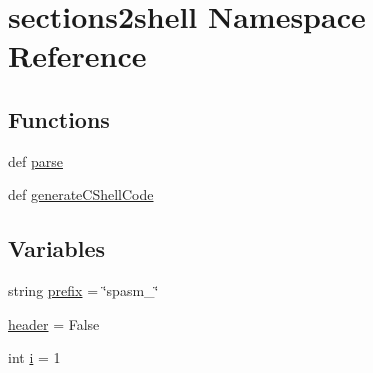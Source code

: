 \hypertarget{namespacesections2shell}{\section{sections2shell \-Namespace \-Reference}
\label{namespacesections2shell}
}
\subsection*{\-Functions}
\begin{DoxyCompactItemize}
\item 
def \hyperlink{namespacesections2shell_a38302b4f9596c193aa75a982a6892b77}{parse}
\item 
def \hyperlink{namespacesections2shell_a30b16df3a0cae10f263d25399b694a01}{generate\-C\-Shell\-Code}
\end{DoxyCompactItemize}
\subsection*{\-Variables}
\begin{DoxyCompactItemize}
\item 
string \hyperlink{namespacesections2shell_a61765c6e86e717fdfa778f3533b3b621}{prefix} = \char`\"{}spasm\-\_\-\char`\"{}
\item 
\hyperlink{namespacesections2shell_a3667169ba9afc983db41b0b9aea336cb}{header} = \-False
\item 
int \hyperlink{namespacesections2shell_a4e78c48a579d23a2c6de71ac9359a9b9}{i} = 1
\end{DoxyCompactItemize}


